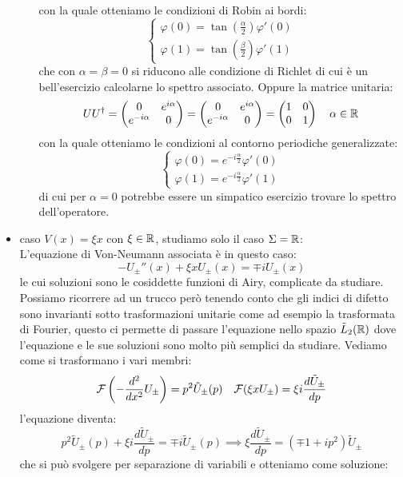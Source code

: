 \begin{itemize}
\begin{enumerate}
 con la quale otteniamo le condizioni di Robin ai bordi:
 \[\begin{cases}
 \varphi(0) = \tan\left(\frac{\alpha}{2}\right) \varphi'(0) \\
 \varphi(1) = \tan\left(\frac{\beta}{2}\right) \varphi'(1)
\end{cases} \]
che con $\alpha=\beta=0$ si riducono alle condizione di Richlet di cui è un bell'esercizio calcolarne lo spettro associato. Oppure la matrice unitaria:
\[UU^\dagger = \begin{pmatrix}
  0 &e^{i\alpha}\\
  e^{-i\alpha} & 0
 \end{pmatrix} =\begin{pmatrix}
   0 &e^{i\alpha}\\
  e^{-i\alpha} & 0
 \end{pmatrix} = \begin{pmatrix}
  1 &0\\
  0 & 1
 \end{pmatrix}\quad \alpha\in\mathbb{R}\]
con la quale otteniamo le condizioni al contorno periodiche generalizzate:
\[\begin{cases}
 \varphi(0) = e^{-i\frac{\alpha}{2}} \varphi'(0) \\
 \varphi(1) = e^{-i\frac{\alpha}{2}} \varphi'(1)
\end{cases} \]
di cui per $\alpha=0$ potrebbe essere un simpatico esercizio trovare lo spettro dell'operatore.
\end{enumerate}
\item caso $V(x) = \xi x$ con $\xi\in\mathbb{R}$, studiamo solo il caso $\Sigma=\mathbb{R}$:\\ \newline
L'equazione di Von-Neumann associata è in questo caso:
\[-U_\pm''(x) + \xi x U_\pm(x) = \mp i U_\pm(x)\]
le cui soluzioni sono le cosiddette funzioni di Airy, complicate da studiare. Possiamo ricorrere ad un trucco però tenendo conto che gli indici di difetto sono invarianti sotto trasformazioni unitarie come ad esempio la trasformata di Fourier, questo ci permette di passare l'equazione nello spazio $\tilde{L}_2(\mathbb{R})$ dove l'equazione e le sue soluzioni sono molto più semplici da studiare. Vediamo come si trasformano i vari membri:
\[\mathcal{F}\left(-\frac{d^2}{dx^2}U_\pm\right) = p^2\tilde{U}_\pm(p)\quad \mathcal{F}(\xi x U_\pm) = \xi i \frac{d\tilde{U}_\pm}{dp}\]
l'equazione diventa:
\[p^2\tilde{U}_\pm(p) +\xi i \frac{d\tilde{U}_\pm}{dp} = \mp i \tilde{U}_\pm(p)\implies \xi\frac{d\tilde{U}_\pm}{dp}=(\mp1+ip^2)\tilde{U}_\pm\]
che si può svolgere per separazione di variabili e otteniamo come soluzione:

\end{itemize}
